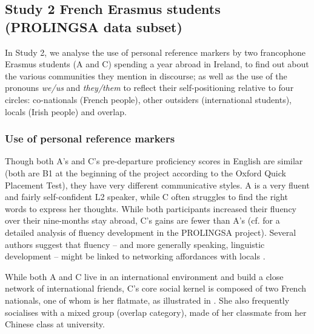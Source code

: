 \documentclass[output=paper]{langscibook}
\begin{document}
\subsection{Study 2 French Erasmus students (PROLINGSA data subset)}

In Study 2, we analyse the use of personal reference markers by two francophone Erasmus students (A and C) spending a year abroad in Ireland, to find out about the various communities they mention in discourse; as well as the use of the pronouns \textit{we/us} and \textit{they/them} to reflect their self-positioning relative to four circles: co-nationals (French people), other outsiders (international students), locals (Irish people) and overlap.

\subsubsection{Use of personal reference markers}

Though both A’s and C’s pre-departure proficiency scores in English are similar (both are B1 at the beginning of the project according to the Oxford Quick Placement Test), they have very different communicative styles. A is a very fluent and fairly self-confident L2 speaker, while C often struggles to find the right words to express her thoughts. While both participants increased their fluency over their nine-months stay abroad, C’s gains are fewer than A’s (cf. \citealt[108]{GilyukGerman2021} for a detailed analysis of fluency development in the PROLINGSA project). Several authors suggest that fluency – and more generally speaking, linguistic development – might be linked to networking affordances with locals \citep{Coleman2015}.

While both A and C live in an international environment and build a close network of international friends, C’s core social kernel is composed of two French nationals, one of whom is her flatmate, as illustrated in . She also frequently socialises with a mixed group (overlap category), made of her classmate from her Chinese class at university.

\TabPositions{1.7cm,3cm,5cm,7cm}
\end{document}
